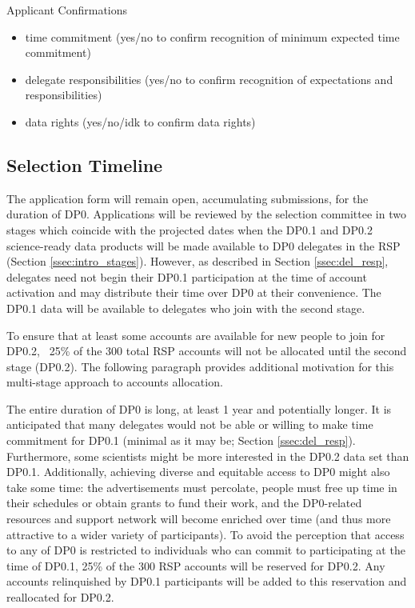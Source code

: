 \documentclass[DM,lsstdraft,authoryear,toc]{lsstdoc}
\begin{document}
Applicant Confirmations
\begin{itemize}
\item time commitment (yes/no to confirm recognition of minimum expected time commitment)
\item delegate responsibilities (yes/no to confirm recognition of expectations and responsibilities)
\item data rights (yes/no/idk to confirm data rights)
\end{itemize}


\subsection{Selection Timeline}\label{ssec:sel_time}

The application form will remain open, accumulating submissions, for the duration of DP0.
Applications will be reviewed by the selection committee in two stages which coincide with the projected dates when the DP0.1 and DP0.2 science-ready data products will be made available to DP0 delegates in the RSP (Section \ref{ssec:intro_stages}).
However, as described in Section \ref{ssec:del_resp}, delegates need not begin their DP0.1 participation at the time of account activation and may distribute their time over DP0 at their convenience.
The DP0.1 data will be available to delegates who join with the second stage.

To ensure that at least some accounts are available for new people to join for DP0.2, ~25\% of the 300 total RSP accounts will not be allocated until the second stage (DP0.2).
The following paragraph provides additional motivation for this multi-stage approach to accounts allocation.

The entire duration of DP0 is long, at least 1 year and potentially longer.
It is anticipated that many delegates would not be able or willing to make time commitment for DP0.1 (minimal as it may be; Section \ref{ssec:del_resp}).
Furthermore, some scientists might be more interested in the DP0.2 data set than DP0.1.
Additionally, achieving diverse and equitable access to DP0 might also take some time: the advertisements must percolate, people must free up time in their schedules or obtain grants to fund their work, and the DP0-related resources and support network will become enriched over time (and thus more attractive to a wider variety of participants).
To avoid the perception that access to any of DP0 is restricted to individuals who can commit to participating at the time of DP0.1, 25\% of the 300 RSP accounts will be reserved for DP0.2.
Any accounts relinquished by DP0.1 participants will be added to this reservation and reallocated for DP0.2.
\end{document}
